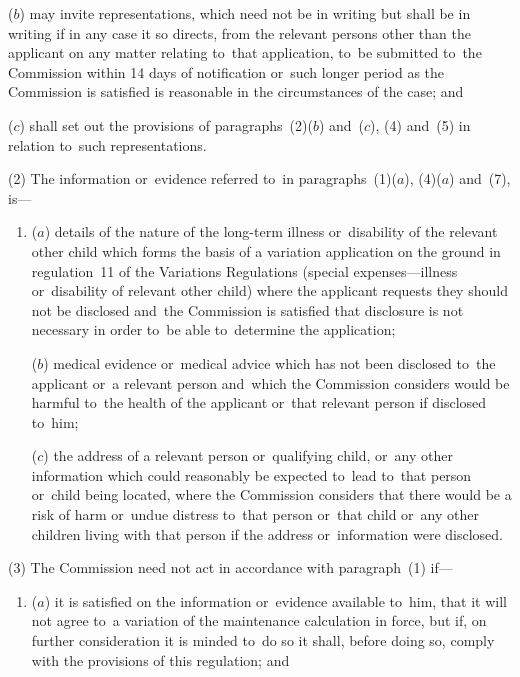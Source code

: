 \documentclass[12pt,a4paper]{article}
\begin{document}
{\begin{enumerate}
($b$) may invite representations, which need not be in writing but shall be in writing if in any case 
it  %
so directs, from the relevant persons other than the applicant on any matter relating to~that application, to~be submitted to~the 
Commission  %
within 14 days of notification or~such longer period as the 
Commission  %
is satisfied is reasonable in the circumstances of the case; and

($c$) shall set out the provisions of paragraphs~(2)($b$)  and~($c$), (4) and~(5) in relation to~such representations.
\end{enumerate}

(2) The information or~evidence referred to~in paragraphs~(1)($a$), (4)($a$)  and~(7), is—
\begin{enumerate}\item[]
($a$) details of the nature of the long-term illness or~disability of the relevant other child which forms the basis of a variation application on the ground in regulation~11 of the Variations Regulations (special expenses—illness or~disability of relevant other child) where the applicant requests they should not be disclosed and~the 
Commission  %
is satisfied that disclosure is not necessary in order to~be able to~determine the application;

($b$) medical evidence or~medical advice which has not been disclosed to~the applicant or~a relevant person and~which the 
Commission  %
considers would be harmful to~the health of the applicant or~that relevant person if disclosed to~him;

($c$) the address of a relevant person or~qualifying child, or~any other information which could reasonably be expected to~lead to~that person or~child being located, where the 
Commission  %
considers that there would be a risk of harm or~undue distress to~that person or~that child or~any other children living with that person if the address or~information were disclosed.
\end{enumerate}

(3) The 
Commission  %
need not act in accordance with paragraph~(1) if—
\begin{enumerate}\item[]
($a$) 
it  %
is satisfied on the information or~evidence available to~him, that 
it  %
will not agree to~a variation of the maintenance calculation in force, but if, on further consideration 
it  %
is minded to~do so 
it  %
shall, before doing so, comply with the provisions of this regulation; and


\end{enumerate}}
\end{document}
